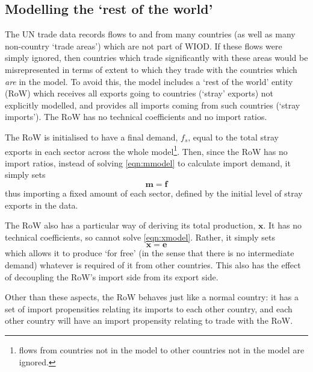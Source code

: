 \documentclass[a4paper]{article}
\begin{document}
\subsection{Modelling the `rest of the world'}\label{sec:RoW}
The UN trade data records flows to and from many countries (as well as many non-country `trade areas') which are not part of WIOD. If these flows were simply ignored, then countries which trade significantly with these areas would be misrepresented in terms of extent to which they trade with the countries which \textit{are} in the model. To avoid this, the model includes a `rest of the world' entity (RoW) which receives all exports going to countries (`stray' exports) not explicitly modelled, and provides all imports coming from such countries (`stray imports'). The RoW has no technical coefficients and no import ratios.

The RoW is initialised to have a final demand, $f_s$, equal to the total stray exports in each sector across the whole model\footnote{flows from countries not in the model to other countries not in the model are ignored.}. Then, since the RoW has no import ratios, instead of solving \cref{eqn:mmodel} to calculate import demand, it simply sets
\begin{equation}\label{eqn:RoW_imports}
\boldsymbol{m} = \boldsymbol{f}
\end{equation}
thus importing a fixed amount of each sector, defined by the initial level of stray exports in the data.

The RoW also has a particular way of deriving its total production, $\boldsymbol{x}$. It has no technical coefficients, so cannot solve \cref{eqn:xmodel}. Rather, it simply sets
\begin{equation}\label{eqn:RoW_total_production}
\boldsymbol{x} = \boldsymbol{e}
\end{equation}
which allows it to produce `for free' (in the sense that there is no intermediate demand) whatever is required of it from other countries. This also has the effect of decoupling the RoW's import side from its export side.

Other than these aspects, the RoW behaves just like a normal country: it has a set of import propensities relating its imports to each other country, and each other country will have an import propensity relating to trade with the RoW.
\end{document}
